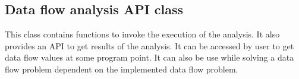 \documentclass[11pt,a4paper,openright]{report}
\begin{document}

 
 
 
 
 
 
\subsection{Data flow analysis API class}
This class contains functions to invoke the execution of the analysis. It also provides an API to get results of the analysis. It can be
accessed by user to get data flow values at some program point. It can also be use while solving a data flow problem dependent on the implemented
data flow problem. 
\end{document}

